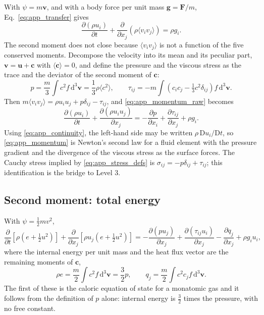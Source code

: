 With $\psi = m\mathbf{v}$, and with a body force per unit mass $\mathbf{g} = \mathbf{F}/m$, Eq.~\eqref{eq:app_transfer} gives
\begin{equation}
    \frac{\partial(\rho u_i)}{\partial t} + \frac{\partial}{\partial x_j}\left(\rho\langle v_i v_j\rangle\right) = \rho g_i .
    \label{eq:app_momentum_raw}
\end{equation}
The second moment does not close because $\langle v_iv_j\rangle$ is not a function of the five conserved moments. Decompose the velocity into its mean and its peculiar part, $\mathbf{v} = \mathbf{u} + \mathbf{c}$ with $\langle\mathbf{c}\rangle = 0$, and define the pressure and the viscous stress as the trace and the deviator of the second moment of $\mathbf{c}$:
\begin{equation}
    p = \frac{m}{3}\int c^2 f\,\mathrm{d}^3\mathbf{v} = \frac{1}{3}\rho\langle c^2\rangle ,
    \qquad
    \tau_{ij} = -m\int\left(c_ic_j - \tfrac{1}{3}c^2\delta_{ij}\right)f\,\mathrm{d}^3\mathbf{v} .
    \label{eq:app_stress_defs}
\end{equation}
Then $m\langle v_iv_j\rangle = \rho u_iu_j + p\delta_{ij} - \tau_{ij}$, and \eqref{eq:app_momentum_raw} becomes
\begin{equation}
    \frac{\partial(\rho u_i)}{\partial t} + \frac{\partial(\rho u_iu_j)}{\partial x_j}
    = -\frac{\partial p}{\partial x_i} + \frac{\partial \tau_{ij}}{\partial x_j} + \rho g_i .
    \label{eq:app_momentum}
\end{equation}
Using \eqref{eq:app_continuity}, the left-hand side may be written $\rho\,\mathrm{D}u_i/\mathrm{D}t$, so \eqref{eq:app_momentum} is Newton's second law for a fluid element with the pressure gradient and the divergence of the viscous stress as the surface forces. The Cauchy stress implied by \eqref{eq:app_stress_defs} is $\sigma_{ij} = -p\delta_{ij} + \tau_{ij}$; this identification is the bridge to Level 3.

\subsection{Second moment: total energy}

With $\psi = \tfrac12 m v^2$,
\begin{equation}
    \frac{\partial}{\partial t}\left[\rho\left(e + \tfrac12 u^2\right)\right]
    + \frac{\partial}{\partial x_j}\left[\rho u_j\left(e + \tfrac12 u^2\right)\right]
    = -\frac{\partial(pu_j)}{\partial x_j} + \frac{\partial(\tau_{ij}u_i)}{\partial x_j} - \frac{\partial q_j}{\partial x_j} + \rho g_iu_i ,
    \label{eq:app_total_energy}
\end{equation}
where the internal energy per unit mass and the heat flux vector are the remaining moments of $\mathbf{c}$,
\begin{equation}
    \rho e = \frac{m}{2}\int c^2f\,\mathrm{d}^3\mathbf{v} = \frac{3}{2}p ,
    \qquad
    q_j = \frac{m}{2}\int c^2c_jf\,\mathrm{d}^3\mathbf{v} .
    \label{eq:app_energy_defs}
\end{equation}
The first of these is the caloric equation of state for a monatomic gas and it follows from the definition of $p$ alone: internal energy is $\tfrac32$ times the pressure, with no free constant.

